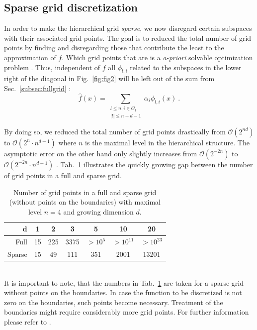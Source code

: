 \subsection{Sparse grid discretization}
In order to make the hierarchical grid \emph{sparse}, we now disregard certain
subspaces with their associated  grid points. The goal is to reduced the total
number of grid points by finding and disregarding those that contribute the
least to the approximation of $f$.
Which grid points that are is a \emph{a-priori}
solvable optimization problem \cite{disspfl}. 
Thus, independent of $f$ all $\phi_{l,i}$
related to the subspaces in the
lower right of the diagonal in Fig.~\ref{fig:fig2} will be left out of the sum
from Sec.~\ref{subsec:fullgrid} \cite{disspfl, artbunshort}:
$$\hat{f}(x) =  \sum_{\substack{l \leq n, i \in G_l\\
    |l| \leq n + d - 1}}{\alpha_i\phi_{l,i}(x)} \ .$$
\par
By doing so, we reduced the total number of grid points drastically
from $\mathcal{O}(2^{nd})$ to $\mathcal{O}(2^{n} \cdot n^{d-1})$ where $n$ is
the maximal level in the hierarchical structure. The asymptotic error on the
other hand only slightly increases from $\mathcal{O}(2^{-2n})$ to
\mbox{$\mathcal{O}(2^{-2n} \cdot n^{d-1})$} \cite{disspfl}. Tab.~\ref{tab:tab1}
illustrates the quickly
growing gap between the number of grid points in a full and sparse grid.
\begin{table}[h]
  \centering
  \begin{tabular}{r | c | c | c | c | c | c}
    d & 1 & 2 & 3 & 5 & 10 & 20 \\
    \hline\hline
    Full & 15 &  225 & 3375 & $>10^5$ & $> 10^{11}$ & $> 10^{23}$ \\
    \hline
    Sparse & 15 & 49 & 111 & 351 & 2001 & 13201 \\
  \end{tabular}
  \captionsetup{width=0.44\textwidth}
  \caption{Number of grid points in a full and sparse grid
    (without points on the boundaries)
    with maximal level $n = 4$ and growing dimension $d$.\label{tab:tab1}}
\end{table}\\
It is important to note, that the numbers in Tab.~\ref{tab:tab1} are taken
for a sparse grid without points on the boundaries. In case the function
to be discretized is not zero on the boundaries, such points become necessary.
Treatment of the boundaries might require considerably
more grid points. For further information please refer to
\cite{disspfl, disspeh}.

